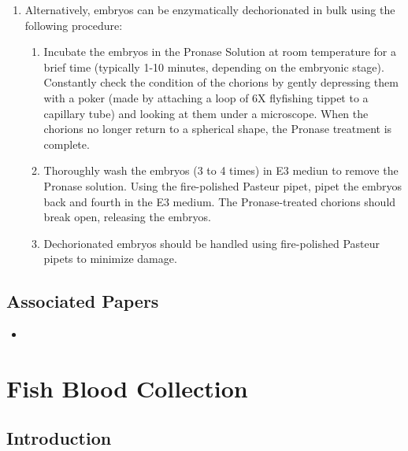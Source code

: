\documentclass[
  letterpaper,
  DIV=11,
  numbers=noendperiod]{scrreprt}
\providecommand{\tightlist}{%
  \setlength{\itemsep}{0pt}\setlength{\parskip}{0pt}}\usepackage{longtable,booktabs,array}
\begin{document}
\begin{enumerate}
\def\labelenumi{\arabic{enumi}.}
\setcounter{enumi}{1}
\item
  Alternatively, embryos can be enzymatically dechorionated in bulk
  using the following procedure:

  \begin{enumerate}
  \def\labelenumii{\alph{enumii}.}
  \tightlist
  \item
    Incubate the embryos in the Pronase Solution at room temperature for
    a brief time (typically 1-10 minutes, depending on the embryonic
    stage). Constantly check the condition of the chorions by gently
    depressing them with a poker (made by attaching a loop of 6X
    flyfishing tippet to a capillary tube) and looking at them under a
    microscope. When the chorions no longer return to a spherical shape,
    the Pronase treatment is complete.
  \item
    Thoroughly wash the embryos (3 to 4 times) in E3 mediun to remove
    the Pronase solution. Using the fire-polished Pasteur pipet, pipet
    the embryos back and fourth in the E3 medium. The Pronase-treated
    chorions should break open, releasing the embryos.
  \item
    Dechorionated embryos should be handled using fire-polished Pasteur
    pipets to minimize damage.
  \end{enumerate}
\end{enumerate}

\hypertarget{associated-papers-45}{%
\section{Associated Papers}\label{associated-papers-45}}

\begin{itemize}
\tightlist
\item
\end{itemize}

\hypertarget{sec-vert_exp-blood_collection}{%
\chapter{Fish Blood Collection}\label{sec-vert_exp-blood_collection}}

\hypertarget{introduction-69}{%
\section{Introduction}\label{introduction-69}}
\end{document}
